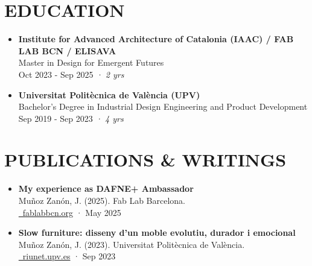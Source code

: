 \documentclass[11pt,a4paper]{article}
\begin{document}
\section*{EDUCATION}
\begin{itemize}[leftmargin=*,label={},itemsep=6pt]
    \item \textbf{Institute for Advanced Architecture of Catalonia (IAAC) / FAB LAB BCN / ELISAVA}\\
    Master in Design for Emergent Futures\\
    Oct 2023 - Sep 2025 \textit{· 2 yrs}
    
    \item \textbf{Universitat Politècnica de València (UPV)}\\
    Bachelor's Degree in Industrial Design Engineering and Product Development\\
    Sep 2019 - Sep 2023 \textit{· 4 yrs}
\end{itemize}

\section*{PUBLICATIONS \& WRITINGS}
\begin{itemize}[leftmargin=*,label={},itemsep=6pt]
    \item \textbf{My experience as DAFNE+ Ambassador}\\
    Muñoz Zanón, J. (2025). Fab Lab Barcelona.\\
    \href{https://fablabbcn.org/blog/emergent-ideas/my-experience-as-dafne-ambassador}{\faLink\ fablabbcn.org} · May 2025
    
    \item \textbf{Slow furniture: disseny d'un moble evolutiu, durador i emocional}\\
    Muñoz Zanón, J. (2023). Universitat Politècnica de València.\\
    \href{https://riunet.upv.es/handle/10251/197203}{\faLink\ riunet.upv.es} · Sep 2023
\end{itemize}

\end{document}
